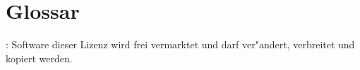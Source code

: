  \chapter{Glossar}
 \label{sec:Glossar_glo}

\begin{acronym}[]%
 
 : Software dieser Lizenz wird frei
 vermarktet und darf ver"andert, verbreitet und kopiert werden.
 
\end{acronym}
